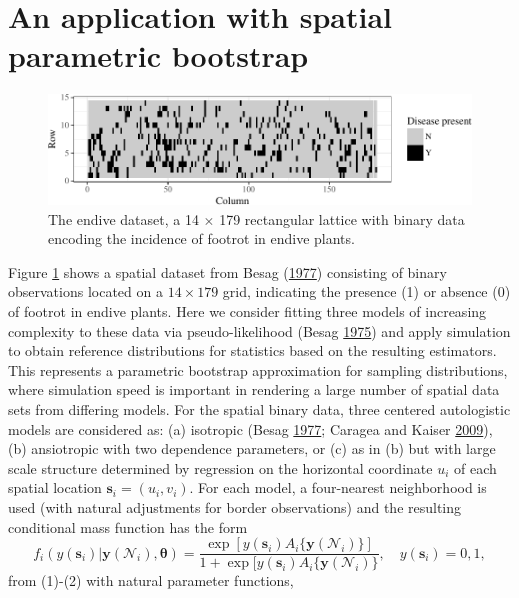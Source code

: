 \documentclass[12pt]{article}
\theoremstyle{definition}
\begin{document}
\hypertarget{spatial-parametric-bootstrap}{%
\section{An application with spatial parametric bootstrap}\label{spatial-parametric-bootstrap}}
\begin{figure}
\centering
\includegraphics{supplement_files/figure-latex/endive-data-plot-1.pdf}
\caption{\label{fig:endive-data-plot}The endive dataset, a 14 \(\times\) 179 rectangular lattice with binary data encoding the incidence of footrot in endive plants.}
\end{figure}
Figure \ref{fig:endive-data-plot} shows a spatial dataset from Besag (\protect\hyperlink{ref-besag1977some}{1977}) consisting of binary observations located on a \(14 \times 179\) grid, indicating the presence (1) or absence (0) of footrot in endive plants. Here we consider fitting three models of increasing complexity to these data via pseudo-likelihood (Besag \protect\hyperlink{ref-besag1975statistical}{1975}) and apply simulation to obtain reference distributions for statistics based on the resulting estimators. This represents a parametric bootstrap approximation for sampling distributions, where simulation speed is important in rendering a large number of spatial data sets from differing models. For the spatial binary data, three centered autologistic models are considered as: (a) isotropic (Besag \protect\hyperlink{ref-besag1977some}{1977}; Caragea and Kaiser \protect\hyperlink{ref-caragea2009autologistic}{2009}), (b) ansiotropic with two dependence parameters, or (c) as in (b) but with large scale structure determined by regression on the horizontal coordinate \(u_i\) of each spatial location \(\boldsymbol s_i=(u_i,v_i)\). For each model, a four-nearest neighborhood is used (with natural adjustments for border observations) and the resulting conditional mass function has the form
\[
f_i(y(\boldsymbol s_i)| \boldsymbol y(\mathcal{N}_i), \boldsymbol \theta) =\frac{\exp[y(\boldsymbol s_i) A_i\{\boldsymbol y(\mathcal{N}_i)\}]}{ 1 +\exp[y(\boldsymbol s_i) A_i\{\boldsymbol y(\mathcal{N}_i)\}}, \quad y(\boldsymbol s_i)=0,1,
\]
from (1)-(2) with natural parameter functions,
\end{document}

